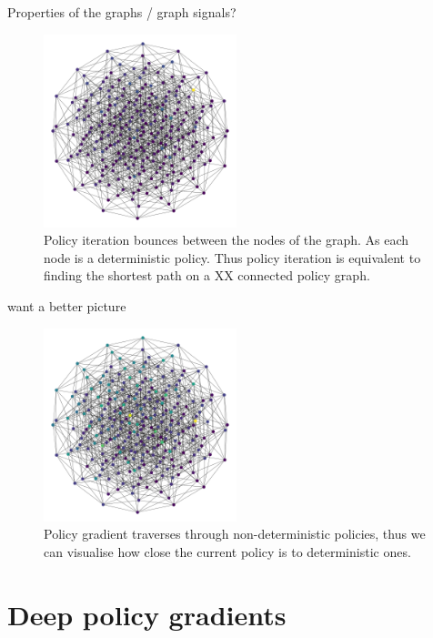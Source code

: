 Properties of the graphs / graph signals?

\begin{figure}[!h]
\centering
\includegraphics[width=0.5\textwidth,height=0.3\textheight]{../../pictures/figures/discrete-graph.png}
\caption{Policy iteration bounces between the nodes of the graph. As each node is a deterministic policy.
Thus policy iteration is equivalent to finding the shortest path on a XX connected policy graph. }
\end{figure}

{\color{red} want a better picture}

\begin{figure}[!h]
\centering
\includegraphics[width=0.5\textwidth,height=0.3\textheight]{../../pictures/figures/interior-graph.png}
\caption{Policy gradient traverses through non-deterministic policies, thus we can visualise how
close the current policy is to deterministic ones.}
\end{figure}

\newpage
\section{Deep policy gradients}\label{ss-extras}

